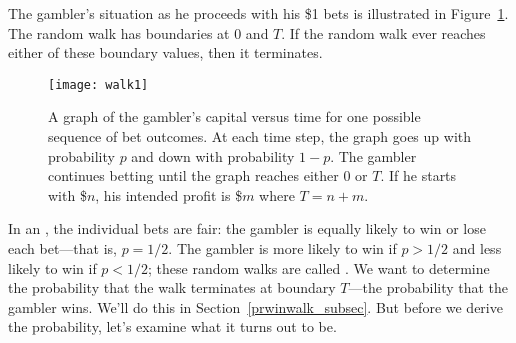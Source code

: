 The gambler's situation as he proceeds with his \$1 bets is illustrated in
Figure~\ref{LN12:fig:walk1}.  The random walk has boundaries at 0 and $T$.  If
the random walk ever reaches either of these boundary values, then it
terminates.

\begin{figure}
  \centerline{\texttt{[image: walk1]}}
  \caption{A graph of the gambler's capital versus time for one
    possible sequence of bet outcomes.  At each time step, the graph
    goes up with probability $p$ and down with probability $1-p$.  The
    gambler continues betting until the graph reaches either 0 or $T$.
    If he starts with \$$n$, his intended profit is \$$m$ where
    $T=n+m$.}
  \label{LN12:fig:walk1}
\end{figure}

In an , the individual bets are fair: the gambler
is equally likely to win or lose each bet---that is, $p = 1/2$.  The
gambler is more likely to win if $p>1/2$ and less likely to win if
$p<1/2$; these random walks are called .  We want to
determine the probability that the walk terminates at boundary
$T$---the probability that the gambler wins.  We'll do this in
Section~\ref{prwinwalk_subsec}.  But before we derive the probability,
let's examine what it turns out to be.

